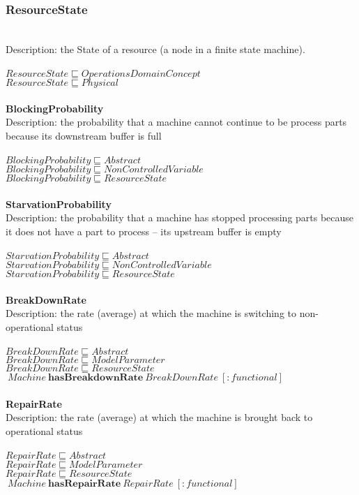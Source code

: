 \subsubsection{ResourceState}\\
Description: the State of a resource (a node in a finite state machine).\\
\\$ ResourceState \sqsubseteq OperationsDomainConcept$
\\$ ResourceState \sqsubseteq Physical$
\\\\   \textbf{BlockingProbability}\\Description: the probability that a machine cannot continue to be process parts because its downstream buffer is full\\
\\$ BlockingProbability \sqsubseteq Abstract$
\\$ BlockingProbability \sqsubseteq NonControlledVariable$
\\$ BlockingProbability \sqsubseteq ResourceState$
\\\\   \textbf{StarvationProbability}\\Description: the probability that a machine has stopped processing parts because it does not have a part to process -- its upstream buffer is empty\\
\\$ StarvationProbability \sqsubseteq Abstract$
\\$ StarvationProbability \sqsubseteq NonControlledVariable$
\\$ StarvationProbability \sqsubseteq ResourceState$
\\\\   \textbf{BreakDownRate}\\Description: the rate (average) at which the machine is switching to non-operational status\\
\\$ BreakDownRate \sqsubseteq Abstract$
\\$ BreakDownRate \sqsubseteq ModelParameter$
\\$ BreakDownRate \sqsubseteq ResourceState$
\\$\: Machine\: \textbf{hasBreakdownRate}\: BreakDownRate\:  [:functional]$
\\\\   \textbf{RepairRate}\\Description: the rate (average) at which the machine is brought back to operational status\\
\\$ RepairRate \sqsubseteq Abstract$
\\$ RepairRate \sqsubseteq ModelParameter$
\\$ RepairRate \sqsubseteq ResourceState$
\\$\: Machine\: \textbf{hasRepairRate}\: RepairRate\:  [:functional]$
